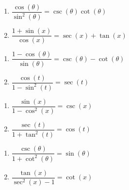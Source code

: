 \documentclass{ximera}
\begin{document}
\begin{multicols}{2}

\begin{enumerate}

\setcounter{enumi}{\value{HW}}

\item $\dfrac{\cos(\theta)}{\sin^{2}(\theta)} = \csc(\theta) \cot(\theta)$
\item $\dfrac{1+ \sin(x)}{\cos(x)} = \sec(x) + \tan(x)$

\setcounter{HW}{\value{enumi}}

\end{enumerate}

\end{multicols}

\begin{multicols}{2}

\begin{enumerate}

\setcounter{enumi}{\value{HW}}

\item $\dfrac{1 - \cos(\theta)}{\sin(\theta)} = \csc(\theta) - \cot(\theta)$
\item  $\dfrac{\cos(t)}{1 - \sin^{2}(t)} = \sec(t)$

\setcounter{HW}{\value{enumi}}

\end{enumerate}

\end{multicols}

\begin{multicols}{2}

\begin{enumerate}

\setcounter{enumi}{\value{HW}}

\item  $\dfrac{\sin(x)}{1 - \cos^{2}(x)} = \csc(x)$
\item  $\dfrac{\sec(t)}{1 + \tan^{2}(t)} = \cos(t)$

\setcounter{HW}{\value{enumi}}

\end{enumerate}

\end{multicols}

\begin{multicols}{2}

\begin{enumerate}

\setcounter{enumi}{\value{HW}}

\item  $\dfrac{\csc(\theta)}{1 + \cot^{2}(\theta)} = \sin(\theta)$
\item   $\dfrac{\tan(x)}{\sec^{2}(x) - 1} = \cot(x)$

\setcounter{HW}{\value{enumi}}

\end{enumerate}

\end{multicols}
\end{document}
